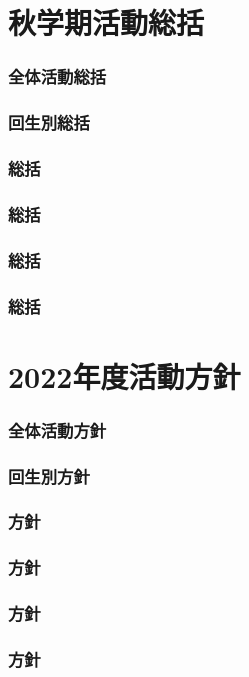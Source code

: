 \part{秋学期活動総括}
\section{全体活動総括}


\section{回生別総括}




\section{\kensuiDepartment{}総括}

\section{\kensuiDepartment{}総括}

\section{\syogaiDepartment{}総括}

\section{\systemDepartment{}総括}


\newpage
\part{2022年度活動方針}
\section{全体活動方針}


\section{回生別方針}



\section{\kensuiDepartment{}方針}

\section{\kensuiDepartment{}方針}

\section{\syogaiDepartment{}方針}

\section{\systemDepartment{}方針}

